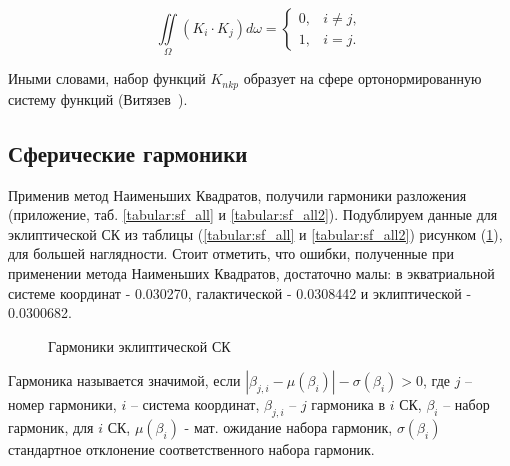 \documentclass[14pt]{article} %
\begin{document}
\begin{equation}
\iint\limits_\Omega \left(K_i \cdot K_j \right) d\omega =  \left\{ \begin{array}{cc}
0, & i \neq j,\\
1, & i = j.
\end{array} \right.
\end{equation}

Иными словами, набор функций $K_{nkp}$ образует на сфере ортонормированную систему функций (Витязев~\cite{book:sf}). 


\subsection{Сферические гармоники}\label{sistem}  
Применив метод Наименьших Квадратов, получили гармоники разложения (приложение, таб. \ref{tabular:sf_all} и \ref{tabular:sf_all2}). Подублируем данные для эклиптической СК из таблицы (\ref{tabular:sf_all} и \ref{tabular:sf_all2}) рисунком (\ref{img:sf_j}), для большей наглядности. Стоит отметить, что ошибки, полученные при применении метода Наименьших Квадратов, достаточно малы: в экватриальной системе координат - 0.030270, галактической - 0.0308442 и эклиптической - 0.0300682.

\begin{figure}[h!]
\caption{Гармоники эклиптической СК}
\label{img:sf_j}
\end{figure}

Гармоника называется значимой, если $|\beta_{j,i} - \mu (\beta_{i})| - \sigma(\beta_{i}) > 0$, где $j$ -- номер гармоники, $i$ -- система координат, $\beta_{j,i}$ -- $j$ гармоника в $i$ СК, $\beta_{i}$ -- набор гармоник, для $i$ СК,  $\mu(\beta_{i})$ - мат. ожидание набора гармоник, $\sigma(\beta_{i})$ стандартное отклонение соответственного набора гармоник.
\end{document}
